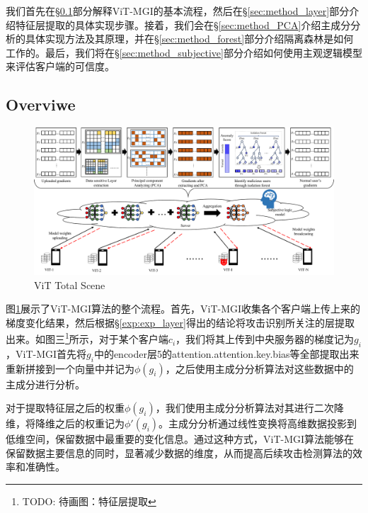 \documentclass[conference]{IEEEtran}
\def\figTotalScene{\textwidth}
\begin{document}
我们首先在\hyperref[sec:method_basic]{§\ref{sec:method_basic}}部分解释ViT-MGI的基本流程，然后在\hyperref[sec:method_layer]{§\ref{sec:method_layer}}部分介绍特征层提取的具体实现步骤。接着，我们会在\hyperref[sec:method_PCA]{§\ref{sec:method_PCA}}介绍主成分分析的具体实现方法及其原理，并在\hyperref[sec:method_forest]{§\ref{sec:method_forest}}部分介绍隔离森林是如何工作的。最后，我们将在\hyperref[sec:method_subjective]{§\ref{sec:method_subjective}}部分介绍如何使用主观逻辑模型来评估客户端的可信度。

\subsection{Overviwe}
\label{sec:method_basic}

\begin{figure}[htbp]
    \centerline{\includegraphics[width=\figTotalScene]{pics/000-totalScene.pdf}}
    \caption{ViT Total Scene}
    \label{fig:totalScene}
\end{figure}

图\hyperref[fig:totalScene]{\ref{fig:totalScene}}展示了ViT-MGI算法的整个流程。首先，ViT-MGI收集各个客户端上传上来的梯度变化结果，然后根据\hyperref[exp:exp_layer]{§\ref{exp:exp_layer}}得出的结论将攻击识别所关注的层提取出来。如图三\footnote{TODO: 待画图：特征层提取}所示，对于某个客户端$c_i$，我们将其上传到中央服务器的梯度记为$g_i$，ViT-MGI首先将$g_i$中的encoder层5的attention.attention.key.bias等全部提取出来重新拼接到一个向量中并记为$\phi(g_i)$，之后使用主成分分析算法对这些数据中的主成分进行分析。

对于提取特征层之后的权重$\phi(g_i)$，我们使用主成分分析算法对其进行二次降维，将降维之后的权重记为$\phi'(g_i)$。主成分分析通过线性变换将高维数据投影到低维空间，保留数据中最重要的变化信息。通过这种方式，ViT-MGI算法能够在保留数据主要信息的同时，显著减少数据的维度，从而提高后续攻击检测算法的效率和准确性。
\end{document}
